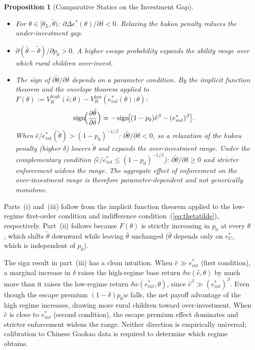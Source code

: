 \documentclass[12pt]{article}
\theoremstyle{plain}
\newtheorem{proposition}{Proposition}
\theoremstyle{definition}
\theoremstyle{remark}
\begin{document}
\begin{proposition}[Comparative Statics on the Investment Gap]
\label{prop:cs}
\begin{itemize}
  \item[\textit{(i)}] For $\theta\in[\theta_{L},\tilde{\theta})$:
    $\partial\Delta e^{*}(\theta)/\partial\delta<0$.
    Relaxing the hukou penalty reduces the under-investment gap.
  \item[\textit{(ii)}] $\partial(\bar{\theta}-\tilde{\theta})/\partial p_{0}>0$.
    A higher escape probability expands the ability range over which rural
    children over-invest.
  \item[\textit{(iii)}] The sign of $\partial\tilde{\theta}/\partial\delta$
    depends on a parameter condition.  By the implicit function theorem and the
    envelope theorem applied to $F(\theta):=V_{R}^{high}(\hat{e};\theta)-
    V_{R}^{low}(e^{*}_{int}(\theta);\theta)$:
    \[
      \operatorname{sign}\!\Bigl(\frac{\partial\tilde{\theta}}{\partial\delta}
      \Bigr)
      =-\operatorname{sign}\!\bigl[(1-p_{0})\hat{e}^{\beta}-(e^{*}_{int})^{\beta}
      \bigr].
    \]
    When $\hat{e}/e^{*}_{int}(\tilde{\theta})>(1-p_{0})^{-1/\beta}$:
    $\partial\tilde{\theta}/\partial\delta<0$, so a \emph{relaxation} of the
    hukou penalty (higher $\delta$) lowers $\tilde{\theta}$ and expands the
    over-investment range.  Under the complementary condition
    ($\hat{e}/e^{*}_{int}\leq(1-p_{0})^{-1/\beta}$): $\partial\tilde{\theta}/
    \partial\delta\geq 0$ and stricter enforcement widens the range.
    The aggregate effect of enforcement on the over-investment range is
    therefore parameter-dependent and not generically monotone.
\end{itemize}
\end{proposition}

Parts~(i) and~(iii) follow from the implicit function theorem applied to the
low-regime first-order condition and indifference condition~(\ref{eq:thetatilde}),
respectively.  Part~(ii) follows because $F(\theta)$ is strictly increasing in
$p_{0}$ at every $\theta$, which shifts $\tilde{\theta}$ downward while leaving
$\bar{\theta}$ unchanged ($\bar{\theta}$ depends only on $e^{*}_{U}$, which is
independent of $p_{0}$).

The sign result in part~(iii) has a clean intuition.  When $\hat{e}\gg
e^{*}_{int}$ (first condition), a marginal increase in $\delta$ raises the
high-regime base return $\delta w(\hat{e},\theta)$ by much more than it raises
the low-regime return $\delta w(e^{*}_{int},\theta)$, since $\hat{e}^{\beta}\gg
(e^{*}_{int})^{\beta}$.  Even though the escape premium $(1-\delta)p_{0}w$ falls,
the net payoff advantage of the high regime increases, drawing more rural children
toward over-investment.  When $\hat{e}$ is close to $e^{*}_{int}$ (second
condition), the escape premium effect dominates and stricter enforcement widens
the range.  Neither direction is empirically universal; calibration to Chinese
Gaokao data is required to determine which regime obtains.
\end{document}
